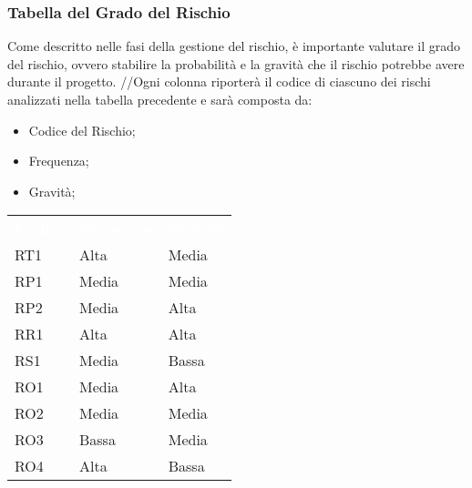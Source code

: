 \clearpage

\subsubsection{Tabella del Grado del Rischio}
Come descritto nelle fasi della gestione del rischio, è importante valutare il grado del rischio, ovvero stabilire la probabilità e la gravità che il rischio potrebbe avere durante il progetto.
//Ogni colonna riporterà il codice di ciascuno dei rischi analizzati nella tabella precedente e sarà composta da:
\begin{itemize}
	\item Codice del Rischio;
	\item Frequenza;
	\item Gravità;
\end{itemize}

{
	\renewcommand{\arraystretch}{2}
	\centering
	
	\begin{longtable}{C{2cm} C{3cm} C{3cm}}
		\textcolor{white}{\textbf{Codice}} & \textcolor{white}{\textbf{Frequenza}} & \textcolor{white}{\textbf{Gravità}}\\	
		
		RT1 & Alta & Media\\
		
		RP1 & Media & Media\\
		
		RP2 & Media & Alta\\
		
		RR1 & Alta & Alta \\
		
		RS1 & Media & Bassa \\
		
		RO1 & Media & Alta \\
		
		RO2 & Media & Media \\
		
		RO3 & Bassa & Media \\
		
		RO4 & Alta & Bassa \\
		
	
	\end{longtable}
	
}
